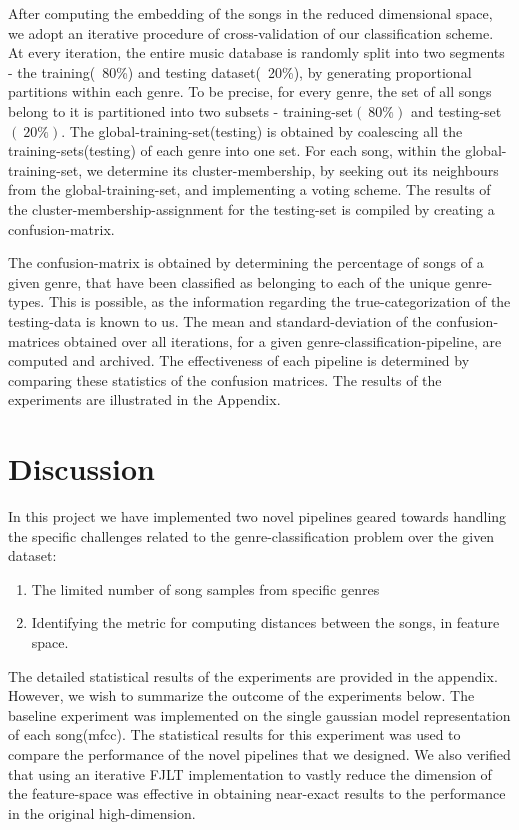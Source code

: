 \documentclass[10pt]{article}
\begin{document}
After computing the embedding of the songs in the reduced dimensional space, we adopt an iterative procedure of cross-validation of our classification scheme. At every iteration, the entire music database is randomly split into two segments - the training(~80\%) and testing dataset(~20\%), by generating proportional partitions within each genre.
To be precise, for every genre, the set of all songs belong to it is partitioned into two subsets - training-set$(~80\%)$ and testing-set$(~20\%)$. The global-training-set(testing) is obtained by coalescing all the training-sets(testing) of each genre into one set. For each song, within the global-training-set, we determine its cluster-membership, by seeking out its neighbours from the global-training-set, and implementing a voting scheme. The results of the cluster-membership-assignment for the testing-set is compiled by creating a confusion-matrix. 

The confusion-matrix is obtained by determining the percentage of songs of a given genre, that have been classified as belonging to each of the unique genre-types. This is possible, as the information regarding the true-categorization of the testing-data is known to us.   The mean and standard-deviation of the confusion-matrices obtained over all iterations, for a given genre-classification-pipeline, are computed and archived. The effectiveness of each pipeline is determined by comparing these statistics of the confusion matrices. The results of the experiments are illustrated in the Appendix. 





\section{Discussion}

In this project we have implemented two novel pipelines geared towards handling the specific challenges related to the genre-classification problem over the given dataset:
\begin{enumerate}
\item The limited number of song samples from specific genres
\item Identifying the metric for computing distances between the songs, in feature space. 
\end{enumerate}

The detailed statistical results of the experiments are provided in the appendix. However, we wish to summarize the outcome of the experiments below. The baseline experiment was implemented on the single gaussian model representation of each song(mfcc). The statistical results for this experiment was used to compare the performance of the novel pipelines that we designed. We also verified that using an iterative FJLT implementation to vastly reduce the dimension of the feature-space was effective in obtaining near-exact results to the performance in the original high-dimension. 
\end{document}
